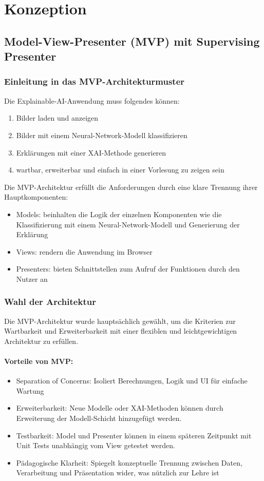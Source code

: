 \chapter{Konzeption}
\label{chap:chapter-4}

\section{Model-View-Presenter (MVP) mit Supervising Presenter}

\subsection{Einleitung in das MVP-Architekturmuster}
Die Explainable-AI-Anwendung muss folgendes können:
\begin{enumerate}
    \item Bilder laden und anzeigen
    \item Bilder mit einem Neural-Network-Modell klassifizieren
    \item Erklärungen mit einer XAI-Methode generieren
    \item wartbar, erweiterbar und einfach in einer Vorlesung zu zeigen sein
\end{enumerate}
Die MVP-Architektur erfüllt die Anforderungen durch eine klare Trennung ihrer Hauptkomponenten:
\begin{itemize}
    \item Models: beinhalten die Logik der einzelnen Komponenten wie die Klassifizierung mit einem Neural-Network-Modell und Generierung der Erklärung
    \item Views: rendern die Anwendung im Browser
    \item Presenters: bieten Schnittstellen zum Aufruf der Funktionen durch den Nutzer an
\end{itemize}

\subsection{Wahl der Architektur}
Die MVP-Architektur wurde hauptsächlich gewählt, um die Kriterien zur Wartbarkeit und Erweiterbarkeit mit einer flexiblen und leichtgewichtigen Architektur zu erfüllen.
\subsubsection{Vorteile von MVP:}
\begin{itemize}
    \item Separation of Concerns: Isoliert Berechnungen, Logik und UI für einfache Wartung
    \item Erweiterbarkeit: Neue Modelle oder XAI-Methoden können durch Erweiterung der Modell-Schicht hinzugefügt werden.
    \item Testbarkeit: Model und Presenter können in einem späteren Zeitpunkt mit Unit Tests unabhängig vom View getestet werden.
    \item Pädagogische Klarheit: Spiegelt konzeptuelle Trennung zwischen Daten, Verarbeitung und Präsentation wider, was nützlich zur Lehre ist
\end{itemize}
